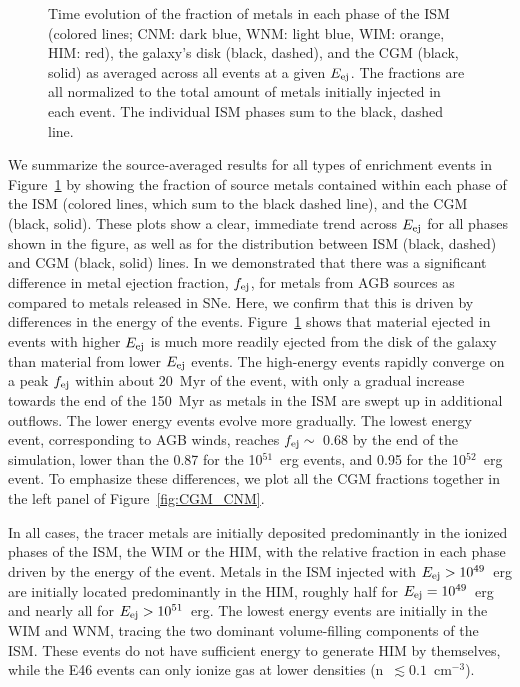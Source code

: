 \documentclass[twocolumn]{aastex62}
\begin{document}
\begin{figure}
\caption{Time evolution of the fraction of metals in each phase of the ISM (colored lines; CNM: dark blue, WNM: light blue, WIM: orange, HIM: red), the galaxy's disk (black, dashed), and the CGM (black, solid) as averaged across all events at a given $E_{\rm ej}$. The fractions are all normalized to the total amount of metals initially injected in each event. The individual ISM phases sum to the black, dashed line.}
\label{fig:ISM_CGM}
\end{figure}

We summarize the source-averaged results for all types of enrichment events in Figure~\ref{fig:ISM_CGM} by showing the fraction of source metals contained within each phase of the ISM (colored lines, which sum to the black dashed line), and the CGM (black, solid). These plots show a clear, immediate trend across $E_{\rm ej}$ for all phases shown in the figure, as well as for the distribution between ISM (black, dashed) and CGM (black, solid) lines. In \cite{Emerick2018b}
we demonstrated that there was a significant difference in metal ejection fraction, $f_{\rm ej}$, for metals from AGB sources as compared to metals released in SNe. Here, we confirm that this is driven by differences in the energy of the events. Figure~\ref{fig:ISM_CGM} shows that material ejected in events with higher $E_{\rm ej}$ is much more readily ejected from the disk of the galaxy than material from lower $E_{\rm ej}$ events. 
The high-energy events rapidly converge on a peak $f_{\rm ej}$ within about 20~Myr of the event, with only a gradual increase towards the end of the 150~Myr as metals in the ISM are swept up in additional outflows. The lower energy events evolve more gradually. The lowest energy event, corresponding to AGB winds, reaches $f_{\rm ej} \sim$~0.68 by the end of the simulation, lower than the 0.87 for the 10$^{51}$~erg events, and 0.95 for the 10$^{52}$~erg event. To emphasize these differences, we plot all the CGM fractions together
in the left panel of Figure~\ref{fig:CGM_CNM}.

In all cases, the tracer metals are initially deposited predominantly in the ionized phases of the ISM, the WIM or the HIM, with the relative fraction in each phase driven by the energy of the event. Metals in the ISM injected with $E_{\rm ej} > 10^{49}$~erg are initially located predominantly in the HIM, roughly half for $E_{\rm ej} = 10^{49}$~erg and nearly all for $E_{\rm ej} > 10^{51}$~erg. The lowest energy events are initially in the WIM and WNM, tracing the two dominant volume-filling components of the ISM. These events do not have sufficient energy to generate HIM by themselves, while the E46 events can only ionize gas at lower densities (n~$\lesssim 0.1$~cm$^{-3}$).
\end{document}

